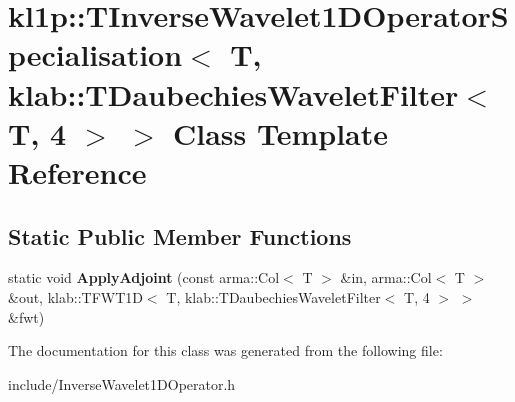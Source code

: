 \hypertarget{classkl1p_1_1TInverseWavelet1DOperatorSpecialisation_3_01T_00_01klab_1_1TDaubechiesWaveletFilter_3_01T_00_014_01_4_01_4}{}\section{kl1p\+:\+:T\+Inverse\+Wavelet1\+D\+Operator\+Specialisation$<$ T, klab\+:\+:T\+Daubechies\+Wavelet\+Filter$<$ T, 4 $>$ $>$ Class Template Reference}
\label{classkl1p_1_1TInverseWavelet1DOperatorSpecialisation_3_01T_00_01klab_1_1TDaubechiesWaveletFilter_3_01T_00_014_01_4_01_4}
\subsection*{Static Public Member Functions}
\begin{DoxyCompactItemize}
\item 
static void {\bfseries Apply\+Adjoint} (const arma\+::\+Col$<$ T $>$ \&in, arma\+::\+Col$<$ T $>$ \&out, klab\+::\+T\+F\+W\+T1D$<$ T, klab\+::\+T\+Daubechies\+Wavelet\+Filter$<$ T, 4 $>$ $>$ \&fwt)\hypertarget{classkl1p_1_1TInverseWavelet1DOperatorSpecialisation_3_01T_00_01klab_1_1TDaubechiesWaveletFilter_3_01T_00_014_01_4_01_4_a3b6beaa7c74fb08177f48ab1014a00ae}{}\label{classkl1p_1_1TInverseWavelet1DOperatorSpecialisation_3_01T_00_01klab_1_1TDaubechiesWaveletFilter_3_01T_00_014_01_4_01_4_a3b6beaa7c74fb08177f48ab1014a00ae}

\end{DoxyCompactItemize}


The documentation for this class was generated from the following file\+:\begin{DoxyCompactItemize}
\item 
include/Inverse\+Wavelet1\+D\+Operator.\+h\end{DoxyCompactItemize}
